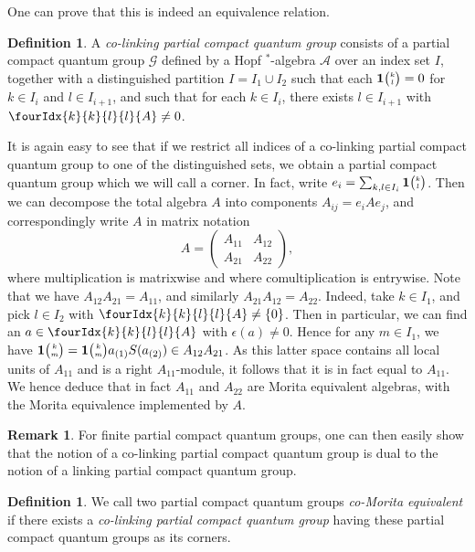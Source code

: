 \documentclass[10pt]{article}
\newcommand{\Grt}[3]{#1{\tiny{\begin{pmatrix} #2\\#3\end{pmatrix}}}}
\newcommand{\UnitC}[2]{\Grt{\mathbf{1}}{#1}{#2}}
\newcommand{\Gr}[5]{\fourIdx{#2}{#4}{#3}{#5}{#1}}%
\theoremstyle{definition}
\newtheorem{Def}[Theorem]{Definition}
\newtheorem{Rem}[Theorem]{Remark}
\numberwithin{equation}{section}
\begin{document}
One can prove that this is indeed an equivalence relation. %

\begin{Def}\label{DefCoLink} A \emph{co-linking partial compact quantum group} consists of a partial compact quantum group $\mathscr{G}$ defined by a Hopf $^*$-algebra $\mathscr{A}$ over an index set $I$, together with a distinguished partition $I = I_1\cup I_2$ such that each $\UnitC{k}{l}=0$ for $k\in I_i$ and $l\in I_{i+1}$, and such that for each $k\in I_i$, there exists $l\in I_{i+1}$ with $\Gr{A}{k}{l}{k}{l}\neq 0$.  
\end{Def} 

It is again easy to see that if we restrict all indices of a co-linking partial compact quantum group to one of the distinguished sets, we obtain a partial compact quantum group which we will call a corner. In fact, write $e_i = \sum_{k,l\in I_i} \UnitC{k}{l}$. Then we can decompose the total algebra $A$ into components $A_{ij} = e_{i}Ae_{j}$, and correspondingly write $A$ in matrix notation \[ A = \begin{pmatrix} A_{11} & A_{12}  \\ A_{21} & A_{22}\end{pmatrix},\] where multiplication is matrixwise and where comultiplication is entrywise. Note that we have $A_{12}A_{21} = A_{11}$, and similarly $A_{21}A_{12} = A_{22}$. Indeed, take $k\in I_1$, and pick $l\in I_2$ with $\Gr{A}{k}{l}{k}{l}\neq \{0\}$. Then in particular, we can find an $a\in \Gr{A}{k}{l}{k}{l}$ with $\epsilon(a)\neq 0$. Hence for any $m\in I_1$, we have $\UnitC{k}{m} = \UnitC{k}{m} a_{(1)}S(a_{(2)}) \in A_{12}A_{21}$. As this latter space contains all local units of $A_{11}$ and is a right $A_{11}$-module, it follows that it is in fact equal to $A_{11}$. We hence deduce that in fact $A_{11}$ and $A_{22}$ are Morita equivalent algebras, with the Morita equivalence implemented by $A$. %

\begin{Rem} For finite partial compact quantum groups, one can then
  easily show that the notion of a co-linking partial compact quantum
  group is dual to the notion of a linking partial compact quantum group.\end{Rem}

\begin{Def} We call two partial compact quantum groups \emph{co-Morita equivalent} if there exists a \emph{co-linking partial compact quantum group} having these partial compact quantum groups as its corners.
\end{Def}
\end{document}
